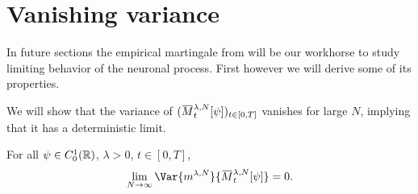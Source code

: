 \section{Vanishing variance}    %

In future sections the empirical martingale from  will be our workhorse to study limiting behavior of the neuronal process.
First however we will derive some of its properties.

We will show that the variance of \((\ol{M}_t^{\lambda,N}[\psi])_{t\in[0,T]}\) vanishes for large \(N\), implying that it has a deterministic limit.    %

\begin{proposition}\label{prop:vanishing-variance}  %
  For all \(\psi \in C_0^1(\mathbb{R})\), \(\lambda > 0\), \(t \in [0,T]\),
  \begin{equation}
    \lim_{N\to\infty} \Var{\lawmu^{\lambda,N}}{\ol{M}_t^{\lambda,N}[\psi]} = 0.
  \end{equation}
\end{proposition}
